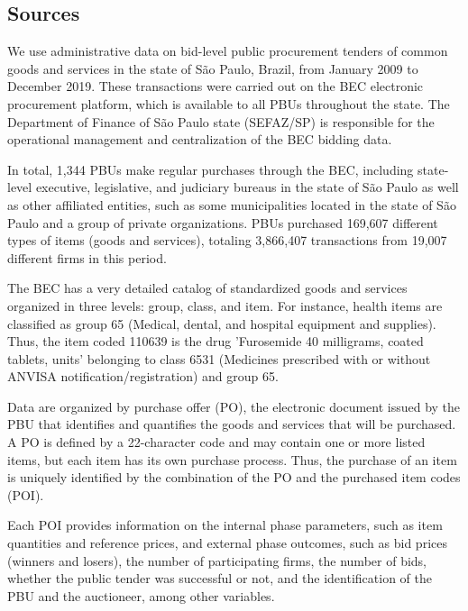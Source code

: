\documentclass[12 pt]{elsarticle}
\begin{document}
\subsection{Sources} We use administrative data on bid-level public procurement tenders of common goods and services in the state of São Paulo, Brazil, from January 2009 to December 2019. These transactions were carried out on the BEC electronic procurement platform, which is available to all PBUs throughout the state. The Department of Finance of São Paulo state (SEFAZ/SP) is responsible for the operational management and centralization of the BEC bidding data.

In total, 1,344 PBUs make regular purchases through the BEC, including state-level executive, legislative, and judiciary bureaus in the state of São Paulo as well as other affiliated entities, such as some municipalities located in the state of São Paulo and a group of private organizations. PBUs purchased 169,607 different types of items (goods and services), totaling 3,866,407 transactions from 19,007 different firms in this period.

The BEC has a very detailed catalog of standardized goods and services organized in three levels: group, class, and item. For instance, health items are classified as group 65 (Medical, dental, and hospital equipment and supplies). Thus, the item coded 110639 is the drug 'Furosemide 40 milligrams, coated tablets, units' belonging to class 6531 (Medicines prescribed with or without ANVISA notification/registration) and group 65.

Data are organized by purchase offer (PO), the electronic document issued by the PBU that identifies and quantifies the goods and services that will be purchased. A PO is defined by a 22-character code and may contain one or more listed items, but each item has its own purchase process. Thus, the purchase of an item is uniquely identified by the combination of the PO and the purchased item codes (POI).

Each POI provides information on the internal phase parameters, such as item quantities and reference prices, and external phase outcomes, such as bid prices (winners and losers), the number of participating firms, the number of bids, whether the public tender was successful or not, and the identification of the PBU and the auctioneer, among other variables.
\end{document}
